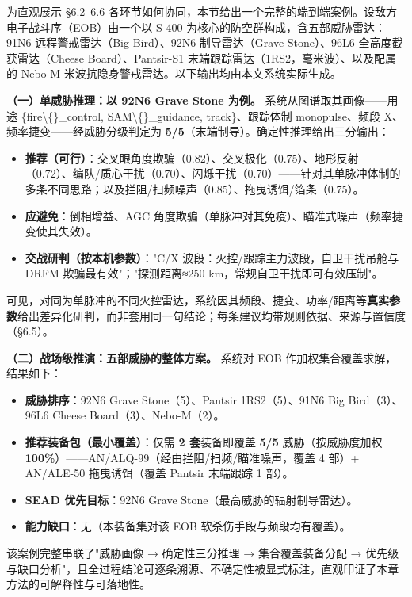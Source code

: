 \documentclass[12pt,a4paper]{ctexart}
\begin{document}
为直观展示 §6.2–6.6 各环节如何协同，本节给出一个完整的端到端案例。设敌方电子战斗序（EOB）由一个以 S-400 为核心的防空群构成，含五部威胁雷达：91N6 远程警戒雷达（Big Bird）、92N6 制导雷达（Grave Stone）、96L6 全高度截获雷达（Cheese Board）、Pantsir-S1 末端跟踪雷达（1RS2，毫米波）、以及配属的 Nebo-M 米波抗隐身警戒雷达。以下输出均由本文系统实际生成。

\textbf{（一）单威胁推理：以 92N6 Grave Stone 为例。} 系统从图谱取其画像——用途 \{fire\textbackslash\{\}\_control, SAM\textbackslash\{\}\_guidance, track\}、跟踪体制 monopulse、频段 X、频率捷变——经威胁分级判定为 \textbf{5/5}（末端制导）。确定性推理给出三分输出：

\begin{itemize}[leftmargin=2em]
\item \textbf{推荐（可行）}：交叉眼角度欺骗（0.82）、交叉极化（0.75）、地形反射（0.72）、编队/质心干扰（0.70）、闪烁干扰（0.70）——针对其单脉冲体制的多条不同思路；以及拦阻/扫频噪声（0.85）、拖曳诱饵/箔条（0.75）。
\item \textbf{应避免}：倒相增益、AGC 角度欺骗（单脉冲对其免疫）、瞄准式噪声（频率捷变使其失效）。
\item \textbf{交战研判（按本机参数）}："C/X 波段：火控/跟踪主力波段，自卫干扰吊舱与 DRFM 欺骗最有效"；"探测距离≈250 km，常规自卫干扰即可有效压制"。
\end{itemize}

可见，对同为单脉冲的不同火控雷达，系统因其频段、捷变、功率/距离等\textbf{真实参数}给出差异化研判，而非套用同一句结论；每条建议均带规则依据、来源与置信度（§6.5）。

\textbf{（二）战场级推演：五部威胁的整体方案。} 系统对 EOB 作加权集合覆盖求解，结果如下：

\begin{itemize}[leftmargin=2em]
\item \textbf{威胁排序}：92N6 Grave Stone（5）、Pantsir 1RS2（5）、91N6 Big Bird（3）、96L6 Cheese Board（3）、Nebo-M（2）。
\item \textbf{推荐装备包（最小覆盖）}：仅需 \textbf{2 套}装备即覆盖 \textbf{5/5} 威胁（按威胁度加权 \textbf{100\%}）——AN/ALQ-99（经由拦阻/扫频/瞄准噪声，覆盖 4 部）+ AN/ALE-50 拖曳诱饵（覆盖 Pantsir 末端跟踪 1 部）。
\item \textbf{SEAD 优先目标}：92N6 Grave Stone（最高威胁的辐射制导雷达）。
\item \textbf{能力缺口}：无（本装备集对该 EOB 软杀伤手段与频段均有覆盖）。
\end{itemize}

该案例完整串联了"威胁画像 → 确定性三分推理 → 集合覆盖装备分配 → 优先级与缺口分析"，且全过程结论可逐条溯源、不确定性被显式标注，直观印证了本章方法的可解释性与可落地性。
\end{document}
